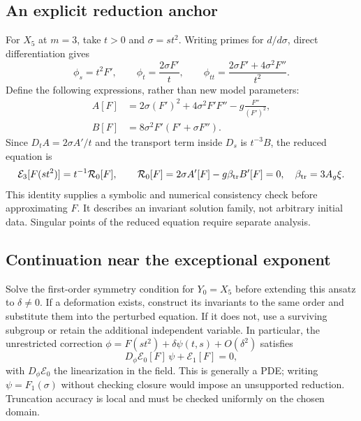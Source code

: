\documentclass[11pt]{article}
\newcommand{\E}{\mathcal E}
\begin{document}
\subsection{An explicit reduction anchor}
For $X_5$ at $m=3$, take $t>0$ and $\sigma=st^2$. Writing primes for
$d/d\sigma$, direct differentiation gives
\begin{equation}
\phi_s=t^2F',\qquad \phi_t=\frac{2\sigma F'}{t},\qquad
\phi_{tt}=\frac{2\sigma F'+4\sigma^2F''}{t^2}.
\end{equation}
Define the following expressions, rather than new model parameters:
\begin{align}
A[F]&=2\sigma(F')^2+4\sigma^2F'F''-g\frac{F''}{(F')^2},\\
B[F]&=8\sigma^2F'(F'+\sigma F'').
\end{align}
Since $D_t A=2\sigma A'/t$ and the transport term inside $D_s$ is
$t^{-3}B$, the reduced equation is
\begin{equation}
\E_3[F(st^2)]=t^{-1}\mathcal R_0[F],\qquad
\mathcal R_0[F]=2\sigma A'[F]-g\beta_{\rm tr} B'[F]=0,
\quad \beta_{\rm tr}=3A_g\xi.
\label{eq:reduction}
\end{equation}
This identity supplies a symbolic and numerical consistency check before
approximating $F$. It describes an invariant solution family, not arbitrary
initial data. Singular points of the reduced equation require separate analysis.

\subsection{Continuation near the exceptional exponent}
Solve the first-order symmetry condition for $Y_0=X_5$ before extending this
ansatz to $\delta\ne0$. If a deformation exists, construct its invariants
to the same order and substitute them into the perturbed equation. If it
does not, use a surviving subgroup or retain the additional independent
variable. In particular, the unrestricted correction
$\phi=F(st^2)+\delta\psi(t,s)+O(\delta^2)$ satisfies
\begin{equation}
D_\phi\E_0[F]\,\psi+\E_1[F]=0,
\end{equation}
with $D_\phi\E_0$ the linearization in the field. This is generally a PDE;
writing $\psi=F_1(\sigma)$ without checking closure would impose an
unsupported reduction. Truncation accuracy is local and must be checked
uniformly on the chosen domain.
\end{document}
